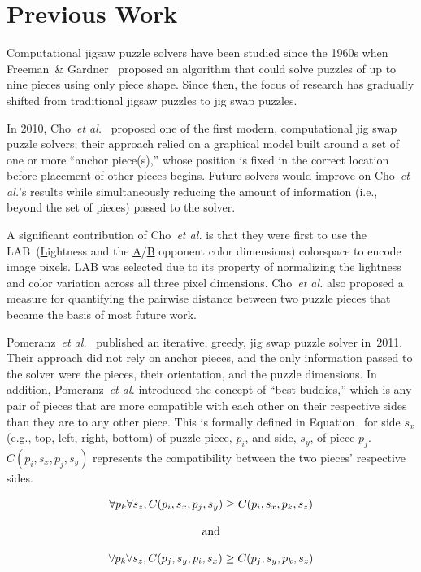 \chapter{Previous Work}\label{chap:previousWork}

Computational jigsaw puzzle solvers have been studied since the 1960s when Freeman~\& Gardner~\cite{freeman1964} proposed an algorithm that could solve puzzles of up to nine pieces using only piece shape.  Since then, the focus of research has gradually shifted from traditional jigsaw puzzles to jig swap puzzles.  

In 2010, Cho~\textit{et al.}~\cite{cho2010} proposed one of the first modern, computational jig swap puzzle solvers; their approach relied on a graphical model built around a set of one or more ``anchor piece(s),'' whose position is fixed in the correct location before placement of other pieces begins.  Future solvers would improve on Cho~\textit{et al.}'s results while simultaneously reducing the amount of information (i.e., beyond the set of pieces) passed to the solver.

A significant contribution of Cho~\textit{et al.} is that they were first to use the LAB~(\underline{L}ightness and the \underline{A}/\underline{B} opponent color dimensions) colorspace to encode image pixels.  LAB was selected due to its property of normalizing the lightness and color variation across all three pixel dimensions.  Cho~\textit{et al.} also proposed a measure for quantifying the pairwise distance between two puzzle pieces that became the basis of most future work.  

Pomeranz~\textit{et al.}~\cite{pomeranz2011} published an iterative, greedy, jig swap puzzle solver in~2011.  Their approach did not rely on anchor pieces, and the only information passed to the solver were the pieces, their orientation, and the puzzle dimensions.  In addition, Pomeranz~\textit{et al.} introduced the concept of ``best buddies,'' which is any pair of pieces that are more compatible with each other on their respective sides than they are to any other piece.  This is formally defined in Equation~ for side $s_x$ (e.g., top, left, right, bottom) of puzzle piece, $p_i$, and side, $s_y$, of piece $p_j$.  $C(p_i, s_x, p_j, s_y)$ represents the compatibility between the two pieces' respective sides.

\begin{equation} \label{eq:pomeranzBestBuddyDefinition}
\centering
\begin{split}
	\begin{matrix}
		\forall{p_{k}}\forall{s_z},C(p_i, s_x, p_j, s_y) \geq C(p_i, s_x, p_k, s_z)
		\\
		\\
		\textnormal{and}
		\\
		\\
		\forall{p_{k}}\forall{s_z},C(p_j, s_y, p_i, s_x) \geq C(p_j, s_y, p_k, s_z)
	\end{matrix}
\end{split}
\end{equation} 

